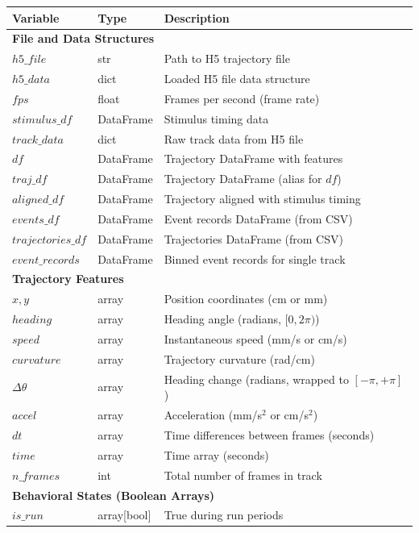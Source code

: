 \documentclass[
  11pt,
]{article}
\begin{document}
\begin{table}[H]
\centering
\footnotesize
\begin{tabular}{p{3cm}p{2cm}p{9cm}}
\hline
\textbf{Variable} & \textbf{Type} & \textbf{Description} \\
\hline
\multicolumn{3}{l}{\textbf{File and Data Structures}} \\
\hline
$h5\_file$ & str & Path to H5 trajectory file \\
$h5\_data$ & dict & Loaded H5 file data structure \\
$fps$ & float & Frames per second (frame rate) \\
$stimulus\_df$ & DataFrame & Stimulus timing data \\
$track\_data$ & dict & Raw track data from H5 file \\
$df$ & DataFrame & Trajectory DataFrame with features \\
$traj\_df$ & DataFrame & Trajectory DataFrame (alias for $df$) \\
$aligned\_df$ & DataFrame & Trajectory aligned with stimulus timing \\
$events\_df$ & DataFrame & Event records DataFrame (from CSV) \\
$trajectories\_df$ & DataFrame & Trajectories DataFrame (from CSV) \\
$event\_records$ & DataFrame & Binned event records for single track \\
\hline
\multicolumn{3}{l}{\textbf{Trajectory Features}} \\
\hline
$x, y$ & array & Position coordinates (cm or mm) \\
$heading$ & array & Heading angle (radians, $[0, 2\pi)$) \\
$speed$ & array & Instantaneous speed (mm/s or cm/s) \\
$curvature$ & array & Trajectory curvature (rad/cm) \\
$\Delta\theta$ & array & Heading change (radians, wrapped to $[-\pi, +\pi]$) \\
$accel$ & array & Acceleration (mm/s$^2$ or cm/s$^2$) \\
$dt$ & array & Time differences between frames (seconds) \\
$time$ & array & Time array (seconds) \\
$n\_frames$ & int & Total number of frames in track \\
\hline
\multicolumn{3}{l}{\textbf{Behavioral States (Boolean Arrays)}} \\
\hline
$is\_run$ & array[bool] & True during run periods \\

\end{tabular}
\end{table}
\end{document}
